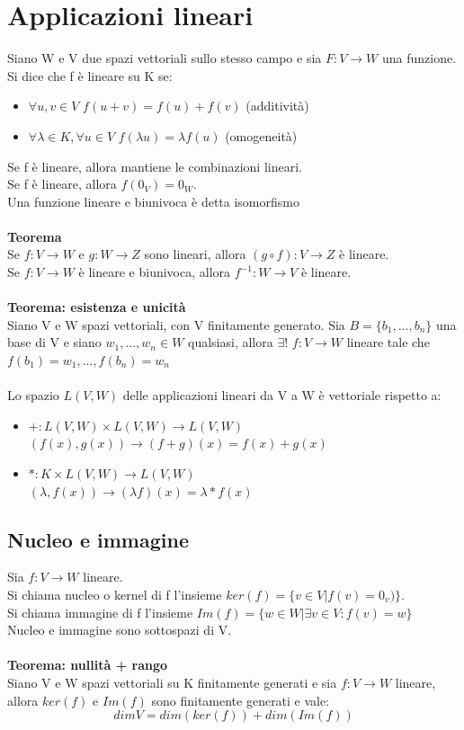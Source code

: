 \documentclass{article}
\begin{document}
\section{Applicazioni lineari}
Siano W e V due spazi vettoriali sullo stesso campo e sia $F:V\rightarrow W$ una funzione. Si dice che f è lineare su K se:
\begin{itemize}
    \item $\forall u,v\in V$ $f(u+v)=f(u)+f(v)$ (additività)
    \item $\forall\lambda\in K, \forall u\in V$ $f(\lambda u)=\lambda f(u)$ (omogeneità)
\end{itemize}
Se f è lineare, allora mantiene le combinazioni lineari.\\
Se f è lineare, allora $f(0_V)=0_W$.\\
Una funzione lineare e biunivoca è detta isomorfismo\\\\
\textbf{Teorema}\\
Se $f:V\rightarrow W$ e $g:W\rightarrow Z$ sono lineari, allora $(g\circ f):V\rightarrow Z$ è lineare.\\
Se $f:V\rightarrow W$ è lineare e biunivoca, allora $f^{-1}:W\rightarrow V$ è lineare.\\\\
\textbf{Teorema: esistenza e unicità}\\
Siano V e W spazi vettoriali, con V finitamente generato. Sia $B=\{b_1,...,b_n\}$ una base di V e siano $w_1,...,w_n\in W$ qualsiasi, allora $\exists!$ $f:V\rightarrow W$ lineare tale che $f(b_1)=w_1,...,f(b_n)=w_n$\\\\
Lo spazio $L(V,W)$ delle applicazioni lineari da V a W è vettoriale rispetto a:
\begin{itemize}
    \item $+:L(V,W)\times L(V,W)\rightarrow L(V,W)$\\
    $(f(x),g(x))\rightarrow (f+g)(x)=f(x)+g(x)$
    \item $*:K\times L(V,W)\rightarrow L(V,W)$\\
    $(\lambda,f(x))\rightarrow (\lambda f)(x)=\lambda*f(x)$
\end{itemize}
\subsection{Nucleo e immagine}
Sia $f:V\rightarrow W$ lineare.\\
Si chiama nucleo o kernel di f l'insieme $ker(f)=\{v\in V|f(v)=0_v)\}$.\\
Si chiama immagine di f l'insieme $Im(f)=\{w\in W|\exists v\in V: f(v)=w\}$\\
Nucleo e immagine sono sottospazi di V.\\\\
\textbf{Teorema: nullità + rango}\\
Siano V e W spazi vettoriali su K finitamente generati e sia $f:V\rightarrow W$ lineare, allora $ker(f)$ e $Im(f)$ sono finitamente generati e vale:
$$dimV=dim(ker(f))+dim(Im(f)) $$
\end{document}
